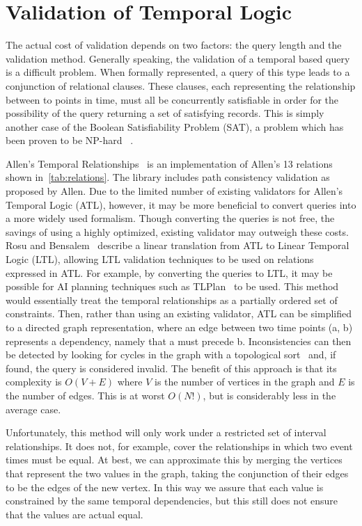 \documentclass{achemso}
\begin{document}
\section{Validation of Temporal Logic}
The actual cost of validation depends on two factors: the query length and the validation method.  Generally speaking, the validation of a temporal based query is a difficult problem.  When formally represented, a query of this type leads to a conjunction of relational clauses.  These clauses, each representing the relationship between to points in time, must all be concurrently satisfiable in order for the possibility of the query returning a set of satisfying records.  This is simply another case of the Boolean Satisfiability Problem (SAT), a problem which has been proven to be NP-hard ~\cite{Cook:1971}.

Allen's Temporal Relationships~\cite{Franke:2011} is an implementation of Allen's 13 relations shown in~\ref{tab:relations}. The library includes path consistency validation as proposed by Allen. Due to the limited number of existing validators for Allen's Temporal Logic (ATL), however, it may be more beneficial to convert queries into a more widely used formalism. Though converting the queries is not free, the savings of using a highly optimized, existing validator may outweigh these costs. Rosu and Bensalem~\cite{Rosu:2006} describe a linear translation from ATL to Linear Temporal Logic (LTL), allowing LTL validation techniques to be used on relations expressed in ATL.
For example, by converting the queries to LTL, it may be possible for AI planning techniques such as TLPlan~\cite{Bacchus:1998} to be used. This method would essentially treat the temporal relationships as a partially ordered set of constraints. Then, rather than using an existing validator, ATL can be simplified to a directed graph representation, where an edge between two time points (a, b) represents a dependency, namely that a must precede b. Inconsistencies can then be detected by looking for cycles in the graph with a topological sort~\cite{Pearce:2004} and, if found, the query is considered invalid.  The benefit of this approach is that its complexity is $O(V + E)$ where $V$ is the number of vertices in the graph and $E$ is the number of edges.  This is at worst $O(N!)$, but is considerably less in the average case.

Unfortunately, this method will only work under a restricted set of interval relationships. It does not, for example, cover the relationships in which two event times must be equal.  At best, we can approximate this by merging the vertices that represent the two values in the graph, taking the conjunction of their edges to be the edges of the new vertex.  In this way we assure that each value is constrained by the same temporal dependencies, but this still does not ensure that the values are actual equal.
\end{document}
